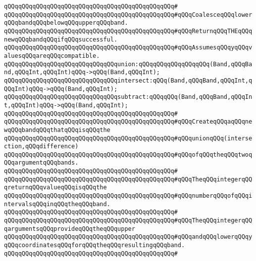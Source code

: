 \verb|qQQqqQQqqQQqqQQqqQQqqQQqqQQqqQQqqQQqqQQqqQQqqQQq#|\newline
\verb|qQQqqQQqqQQqqQQqqQQqqQQqqQQqqQQqqQQqqQQqqQQqqQQq#qQQqCoalesceqQQqlowerqQQqbandqQQqbelowqQQqupperqQQqband.|\newline
\verb|qQQqqQQqqQQqqQQqqQQqqQQqqQQqqQQqqQQqqQQqqQQqqQQq#qQQqReturnqQQqTHEqQQqnewqQQqbandqQQqifqQQqsuccessful.|\newline
\verb|qQQqqQQqqQQqqQQqqQQqqQQqqQQqqQQqqQQqqQQqqQQqqQQq#qQQqAssumesqQQqyqQQqvaluesqQQqareqQQqcompatible.|\newline
\newline
\newline
\verb|qQQqqQQqqQQqqQQqqQQqqQQqqQQqqQQqunion:qQQqqQQqqQQqqQQqqQQq(Band,qQQqBand,qQQqInt,qQQqInt)qQQq->qQQq(Band,qQQqInt);|\newline
\verb|qQQqqQQqqQQqqQQqqQQqqQQqqQQqqQQqintersect:qQQq(Band,qQQqBand,qQQqInt,qQQqInt)qQQq->qQQq(Band,qQQqInt);|\newline
\verb|qQQqqQQqqQQqqQQqqQQqqQQqqQQqqQQqsubtract:qQQqqQQq(Band,qQQqBand,qQQqInt,qQQqInt)qQQq->qQQq(Band,qQQqInt);|\newline
\verb|qQQqqQQqqQQqqQQqqQQqqQQqqQQqqQQqqQQqqQQqqQQqqQQq#|\newline
\verb|qQQqqQQqqQQqqQQqqQQqqQQqqQQqqQQqqQQqqQQqqQQqqQQq#qQQqCreateqQQqaqQQqnewqQQqbandqQQqthatqQQqisqQQqthe|\newline
\verb|qQQqqQQqqQQqqQQqqQQqqQQqqQQqqQQqqQQqqQQqqQQqqQQq#qQQqunionqQQq(intersection,qQQqdifference)|\newline
\verb|qQQqqQQqqQQqqQQqqQQqqQQqqQQqqQQqqQQqqQQqqQQqqQQq#qQQqofqQQqtheqQQqtwoqQQqargumentqQQqbands.|\newline
\verb|qQQqqQQqqQQqqQQqqQQqqQQqqQQqqQQqqQQqqQQqqQQqqQQq#|\newline
\verb|qQQqqQQqqQQqqQQqqQQqqQQqqQQqqQQqqQQqqQQqqQQqqQQq#qQQqTheqQQqintegerqQQqreturnqQQqvalueqQQqisqQQqthe|\newline
\verb|qQQqqQQqqQQqqQQqqQQqqQQqqQQqqQQqqQQqqQQqqQQqqQQq#qQQqnumberqQQqofqQQqintervalsqQQqinqQQqtheqQQqband.|\newline
\verb|qQQqqQQqqQQqqQQqqQQqqQQqqQQqqQQqqQQqqQQqqQQqqQQq#|\newline
\verb|qQQqqQQqqQQqqQQqqQQqqQQqqQQqqQQqqQQqqQQqqQQqqQQq#qQQqTheqQQqintegerqQQqargumentsqQQqprovideqQQqtheqQQqupper|\newline
\verb|qQQqqQQqqQQqqQQqqQQqqQQqqQQqqQQqqQQqqQQqqQQqqQQq#qQQqandqQQqlowerqQQqyqQQqcoordinatesqQQqforqQQqtheqQQqresultingqQQqband.|\newline
\verb|qQQqqQQqqQQqqQQqqQQqqQQqqQQqqQQqqQQqqQQqqQQqqQQq#|\newline
